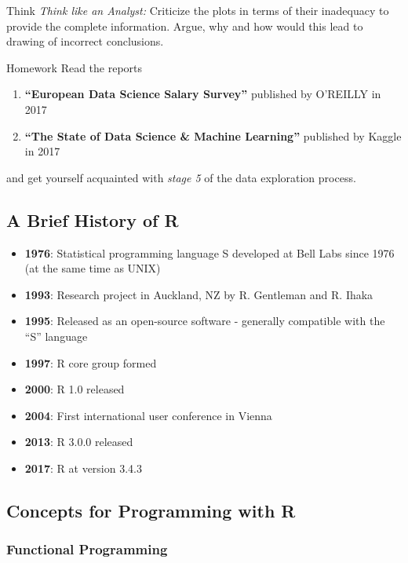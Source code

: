 \documentclass[12pt]{book}\usepackage{knitr}
\begin{document}
\begin{DIY}{Think}
\emph{Think like an Analyst:} Criticize the plots in terms of their inadequacy to provide the complete information. Argue, why and how would this lead to drawing of incorrect conclusions. 
\end{DIY}

\begin{DIY}{Homework}
Read the reports
\begin{enumerate}
  \item \textbf{``European Data Science Salary Survey''} published by O'REILLY in 2017
  \item \textbf{``The State of Data Science \& Machine Learning''} published by Kaggle in 2017
\end{enumerate}
and get yourself acquainted with \emph{stage 5} of the data exploration process.
\end{DIY}

\subsection{A Brief History of R}
\begin{itemize}
  \item \textbf{1976}: Statistical programming language S developed at Bell Labs since 1976 (at the same time as UNIX)
  \item \textbf{1993}: Research project in Auckland, NZ  by R. Gentleman and R. Ihaka
  \item \textbf{1995}: Released as an open-source software - generally compatible with the ``S'' language
  \item \textbf{1997}: R core group formed
  \item \textbf{2000}: R 1.0 released
  \item \textbf{2004}: First international user conference in Vienna
  \item \textbf{2013}: R 3.0.0 released
  \item \textbf{2017}: R at version 3.4.3
\end{itemize}

\newpage
\subsection{Concepts for Programming with R}
\subsubsection{Functional Programming}
\begin{HIGHLIGHT}
\par{}
\end{HIGHLIGHT}
\end{document}

